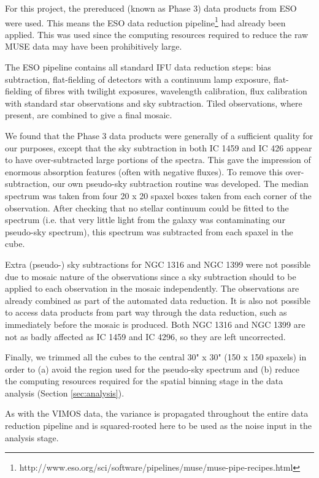 		For this project, the prereduced (known as Phase 3) data products from ESO were used. This means the ESO data reduction pipeline\footnote{http://www.eso.org/sci/software/pipelines/muse/muse-pipe-recipes.html} had already been applied. This was used since the computing resources required to reduce the raw MUSE data may have been prohibitively large.

		The ESO pipeline contains all standard IFU data reduction steps: bias subtraction, flat-fielding of detectors with a continuum lamp exposure, flat-fielding of fibres with twilight exposures, wavelength calibration, flux calibration with standard star observations and sky subtraction. Tiled observations, where present, are combined to give a final mosaic.

		We found that the Phase 3 data products were generally of a sufficient quality for our purposes, except that the sky subtraction in both IC 1459 and IC 426 appear to have over-subtracted large portions of the spectra. This gave the impression of enormous absorption features (often with negative fluxes). To remove this over-subtraction, our own pseudo-sky subtraction routine was developed. The median spectrum was taken from four 20 x 20 spaxel boxes taken from each corner of the observation. After checking that no stellar continuum could be fitted to the spectrum (i.e. that very little light from the galaxy was contaminating our pseudo-sky spectrum), this spectrum was subtracted from each spaxel in the cube. 

		Extra (pseudo-) sky subtractions for NGC 1316 and NGC 1399 were not possible due to mosaic nature of the observations since a sky subtraction should to be applied to each observation in the mosaic independently. The observations are already combined as part of the automated data reduction. It is also not possible to access data products from part way through the data reduction, such as immediately before the mosaic is produced. Both NGC 1316 and NGC 1399 are not as badly affected as IC 1459 and IC 4296, so they are left uncorrected. 

		Finally, we trimmed all the cubes to the central 30" x 30" (150 x 150 spaxels) in order to (a) avoid the region used for the pseudo-sky spectrum and (b) reduce the computing resources required for the spatial binning stage in the data analysis (Section \ref{sec:analysis}). 

		As with the VIMOS data, the variance is propagated throughout the entire data reduction pipeline and is squared-rooted here to be used as the noise input in the analysis stage. 
